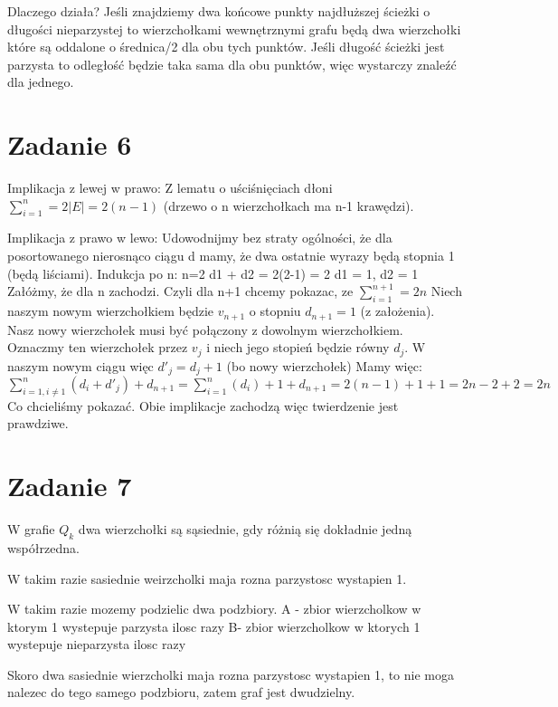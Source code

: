 \documentclass[12pt]{article}
\begin{document}
Dlaczego działa? Jeśli znajdziemy dwa końcowe punkty najdłuższej ścieżki o długości nieparzystej to wierzchołkami wewnętrznymi grafu będą dwa wierzchołki które są oddalone o średnica/2 dla obu tych punktów. Jeśli długość ścieżki jest parzysta to odległość będzie taka sama dla obu punktów, więc wystarczy znaleźć dla jednego.


\section{Zadanie 6}
Implikacja z lewej w prawo:
Z lematu o uściśnięciach dłoni $\sum_{i=1}^{n} = 2|E| = 2(n-1)$ (drzewo o n wierzchołkach ma n-1 krawędzi).

Implikacja z prawo w lewo:
Udowodnijmy bez straty ogólności, że dla posortowanego nierosnąco ciągu d mamy, że dwa ostatnie wyrazy będą stopnia 1 (będą liściami). 
Indukcja po n:
n=2
d1 + d2 = 2(2-1) = 2
d1 = 1, d2 = 1 
Załóżmy, że dla n zachodzi. Czyli dla n+1 chcemy pokazac, ze $\sum_{i=1}^{n+1} = 2n$
Niech naszym nowym wierzchołkiem będzie $v_{n+1}$ o stopniu $d_{n+1} = 1$ (z założenia). Nasz nowy wierzchołek musi być połączony z dowolnym wierzchołkiem. Oznaczmy ten wierzchołek przez $v_j$ i niech jego stopień będzie równy $d_j$.
W naszym nowym ciągu więc $d'_j = d_j+1$ (bo nowy wierzchołek)
Mamy więc:
$\sum_{i=1, i\neq1}^{n} (d_i + d'_j) + d_{n+1} = \sum_{i=1}^n (d_i) + 1 + d_{n+1} = 2(n-1) + 1 + 1 = 2n - 2 + 2 = 2n$
Co chcieliśmy pokazać.
Obie implikacje zachodzą więc twierdzenie jest prawdziwe.



\section{Zadanie 7}
W grafie $Q_k$ dwa wierzchołki są sąsiednie, gdy różnią się dokładnie jedną współrzedna.

W takim razie sasiednie weirzcholki maja rozna parzystosc wystapien 1.

W takim razie mozemy podzielic dwa podzbiory.
A - zbior wierzcholkow w ktorym 1 wystepuje parzysta ilosc razy
B- zbior wierzcholkow w ktorych 1 wystepuje nieparzysta ilosc razy

Skoro dwa sasiednie wierzcholki maja rozna parzystosc wystapien 1, to nie moga nalezec do tego samego podzbioru, zatem graf jest dwudzielny.
\end{document}
